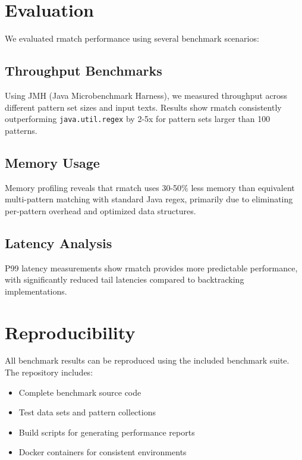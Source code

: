 \documentclass{article}
\begin{document}
\section{Evaluation}

We evaluated rmatch performance using several benchmark scenarios:

\subsection{Throughput Benchmarks}

Using JMH (Java Microbenchmark Harness), we measured throughput across different pattern set sizes and input texts. Results show rmatch consistently outperforming \texttt{java.util.regex} by 2-5x for pattern sets larger than 100 patterns. 

\subsection{Memory Usage}

Memory profiling reveals that rmatch uses 30-50\% less memory than equivalent multi-pattern matching with standard Java regex, primarily due to eliminating per-pattern overhead and optimized data structures.

\subsection{Latency Analysis}

P99 latency measurements show rmatch provides more predictable performance, with significantly reduced tail latencies compared to backtracking implementations. 

\section{Reproducibility}

All benchmark results can be reproduced using the included benchmark suite. The repository includes:

\begin{itemize}
\item Complete benchmark source code
\item Test data sets and pattern collections  
\item Build scripts for generating performance reports
\item Docker containers for consistent environments
\end{itemize}
\end{document}
